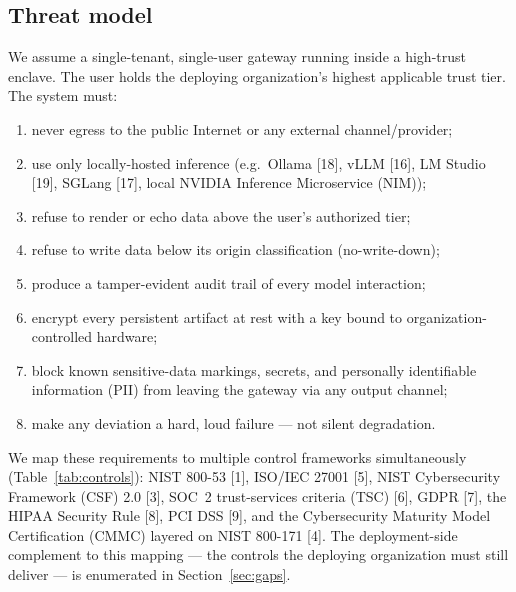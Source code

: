 \documentclass[11pt]{article}
\begin{document}
\subsection{Threat model}

We assume a single-tenant, single-user gateway running inside a
high-trust enclave. The user holds the deploying organization's highest
applicable trust tier. The system must:

\begin{enumerate}
  \item never egress to the public Internet or any external channel/provider;
  \item use only locally-hosted inference (e.g.\ Ollama [18], vLLM [16],
    LM Studio [19], SGLang [17], local NVIDIA Inference Microservice (NIM));
  \item refuse to render or echo data above the user's authorized tier;
  \item refuse to write data below its origin classification (no-write-down);
  \item produce a tamper-evident audit trail of every model interaction;
  \item encrypt every persistent artifact at rest with a key bound to
    organization-controlled hardware;
  \item block known sensitive-data markings, secrets, and personally
    identifiable information (PII) from leaving the gateway via any
    output channel;
  \item make any deviation a hard, loud failure --- not silent
    degradation.
\end{enumerate}

We map these requirements to multiple control frameworks simultaneously
(Table~\ref{tab:controls}): NIST 800-53 [1], ISO/IEC 27001 [5], NIST
Cybersecurity Framework (CSF) 2.0 [3], SOC~2 trust-services criteria
(TSC) [6], GDPR [7], the HIPAA Security Rule [8], PCI DSS [9], and the
Cybersecurity Maturity Model Certification (CMMC) layered on NIST
800-171 [4]. The deployment-side complement to this mapping --- the
controls the deploying organization must still deliver --- is
enumerated in Section~\ref{sec:gaps}.
\end{document}
